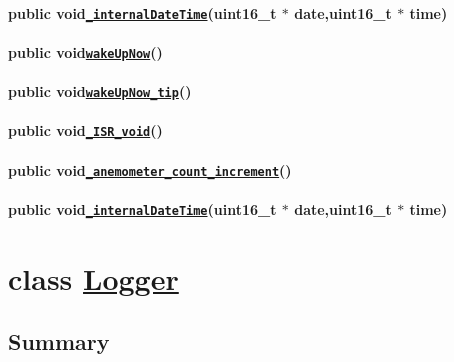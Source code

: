 \paragraph*{{\ttfamily public void}\href{#Logger_8cpp_1a7551515cf6f018df3d8d942710936aef}{\tt {\ttfamily \+\_\+internal\+Date\+Time}}{\ttfamily (uint16\+\_\+t $\ast$ date,uint16\+\_\+t $\ast$ time)}}

\paragraph*{{\ttfamily public void}\href{#Logger_8h_1adee29828901ea1b4f99ce305fa3e17bd}{\tt {\ttfamily wake\+Up\+Now}}{\ttfamily ()}}

\paragraph*{{\ttfamily public void}\href{#Logger_8h_1a1a3b380e75d68eef4c3913816773e1b5}{\tt {\ttfamily wake\+Up\+Now\+\_\+tip}}{\ttfamily ()}}

\paragraph*{{\ttfamily public void}\href{#Logger_8h_1a9c215a00c214c880d04481d256d8d522}{\tt {\ttfamily \+\_\+\+I\+S\+R\+\_\+void}}{\ttfamily ()}}

\paragraph*{{\ttfamily public void}\href{#Logger_8h_1aa2e4ccb5b638347db4da535aac7ac209}{\tt {\ttfamily \+\_\+anemometer\+\_\+count\+\_\+increment}}{\ttfamily ()}}

\paragraph*{{\ttfamily public void}\href{#Logger_8h_1a7551515cf6f018df3d8d942710936aef}{\tt {\ttfamily \+\_\+internal\+Date\+Time}}{\ttfamily (uint16\+\_\+t $\ast$ date,uint16\+\_\+t $\ast$ time)}}

\section*{class {\ttfamily \hyperlink{classLogger}{Logger}}}

\subsection*{Summary}

